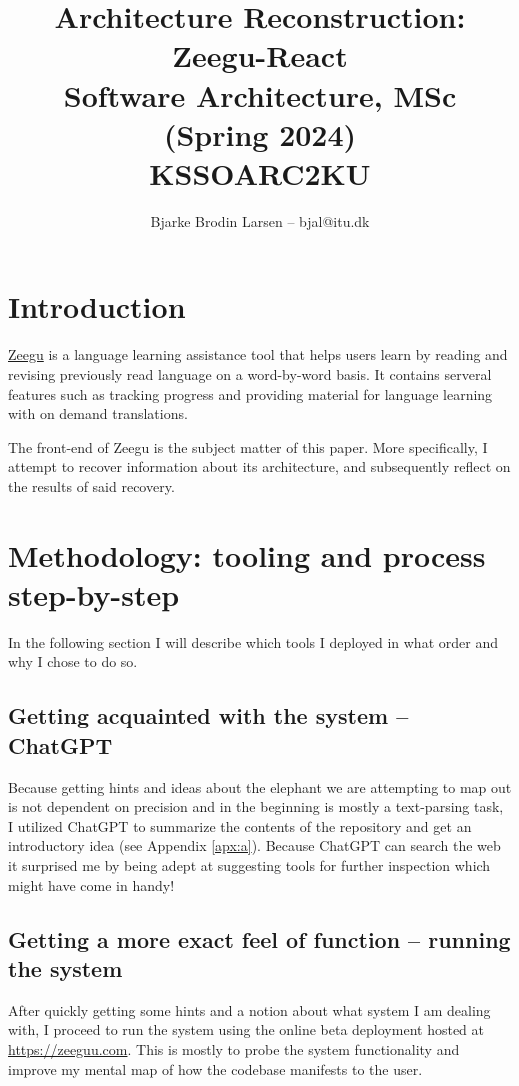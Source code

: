 \documentclass{article}
\title{Architecture Reconstruction: Zeegu-React \\ \normalsize Software Architecture, MSc (Spring 2024) \\ KSSOARC2KU \\}
\author{Bjarke Brodin Larsen -- bjal@itu.dk}
\begin{document}
\maketitle
\tableofcontents

\clearpage
\section{Introduction}

\href{https://zeeguu.com}{Zeegu} is a language learning assistance tool
that helps users learn by reading and revising previously read language on a word-by-word basis.
It contains serveral features such as tracking progress and providing material for language learning
with on demand translations.

\vspace*{1em}\noindent
The front-end of Zeegu is the subject matter of this paper.
More specifically, I attempt to recover information about its architecture,
and subsequently reflect on the results of said recovery.

\section{Methodology: tooling and process step-by-step}

In the following section I will describe which tools I 
deployed in what order and why I chose to do so.

\subsection{Getting acquainted with the system -- ChatGPT}

Because getting hints and ideas about the elephant we are attempting to 
map out is not dependent on precision and in the beginning is mostly a
text-parsing task, I utilized ChatGPT\cite{gpt4} to summarize the
contents of the repository and get an introductory idea 
(see Appendix \ref{apx:a}).
Because ChatGPT can search the web it surprised me by being adept at 
suggesting tools for further inspection which might have come in handy!

\subsection{Getting a more exact feel of function -- running the system}

After quickly getting some hints and a notion about what system I am dealing with,
I proceed to run the system using the online beta deployment hosted at \href{https://zeeguu.com}{https://zeeguu.com}.
This is mostly to probe the system functionality and improve my mental map of how the codebase manifests to the user.
\end{document}
